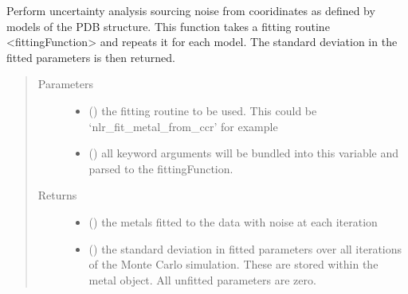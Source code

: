 \documentclass[a4paper,10pt,english,openany,oneside]{sphinxmanual}
\begin{document}
\begin{fulllineitems}
\label{\detokenize{reference/generated/paramagpy.fit.fit_error_models:paramagpy.fit.fit_error_models}}
\sphinxAtStartPar
Perform uncertainty analysis sourcing noise from cooridinates as defined
by models of the PDB structure.
This function takes a fitting routine \textless{}fittingFunction\textgreater{} and repeats it for
each model. The standard deviation in the fitted parameters is then returned.
\begin{quote}\begin{description}
\item[{Parameters}] \leavevmode\begin{itemize}
\item {} 
\sphinxAtStartPar
{} () \textendash{} the fitting routine to be used.
This could be ‘nlr\_fit\_metal\_from\_ccr’ for example

\item {} 
\sphinxAtStartPar
{} () \textendash{} all key\sphinxhyphen{}word arguments will be bundled into this variable and
parsed to the fittingFunction.

\end{itemize}

\item[{Returns}] \leavevmode
\sphinxAtStartPar
\begin{itemize}
\item {} 
\sphinxAtStartPar
{} () \textendash{} the metals fitted to the data with noise at each iteration

\item {} 
\sphinxAtStartPar
{} () \textendash{} the standard deviation in fitted parameters over all iterations of the
Monte Carlo simulation.
These are stored within the metal object. All unfitted parameters
are zero.

\end{itemize}


\end{description}\end{quote}

\end{fulllineitems}
\end{document}
